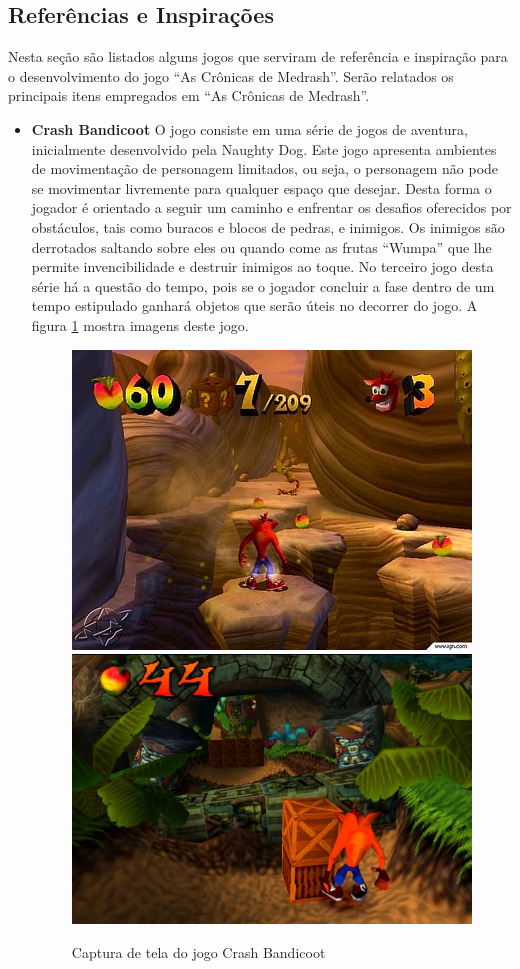 \subsection{Referências e Inspirações}
Nesta seção são listados alguns jogos que serviram de referência e inspiração 
para o desenvolvimento do jogo ``As Crônicas de Medrash''. Serão relatados os principais 
itens empregados em ``As Crônicas de Medrash''.

\begin{itemize}
\item {\bf Crash Bandicoot}
O jogo consiste 
em uma série de jogos de aventura, inicialmente desenvolvido pela Naughty Dog.
Este jogo apresenta ambientes de movimentação de personagem limitados, ou seja, 
o personagem não pode se movimentar livremente para qualquer espaço que desejar.
 Desta forma o jogador é orientado a seguir um caminho e enfrentar os desafios 
oferecidos por obstáculos, tais como buracos e blocos de pedras, e inimigos.
Os inimigos são derrotados saltando sobre eles ou quando come as frutas ``Wumpa'' que lhe 
permite invencibilidade e destruir inimigos ao toque.
No terceiro jogo desta série há a questão do tempo, pois se o jogador concluir a fase
 dentro de um tempo estipulado ganhará objetos que serão úteis no decorrer do jogo. A figura \ref{img:crash} mostra imagens deste jogo.

\begin{figure}[!ht]
 \centering
 \includegraphics[scale=0.705]{Imagens/crash1.png}
 \includegraphics[scale=0.57]{Imagens/crash2.png}
 \caption{Captura de tela do jogo Crash Bandicoot}
 \label{img:crash}
\end{figure}


\end{itemize}
